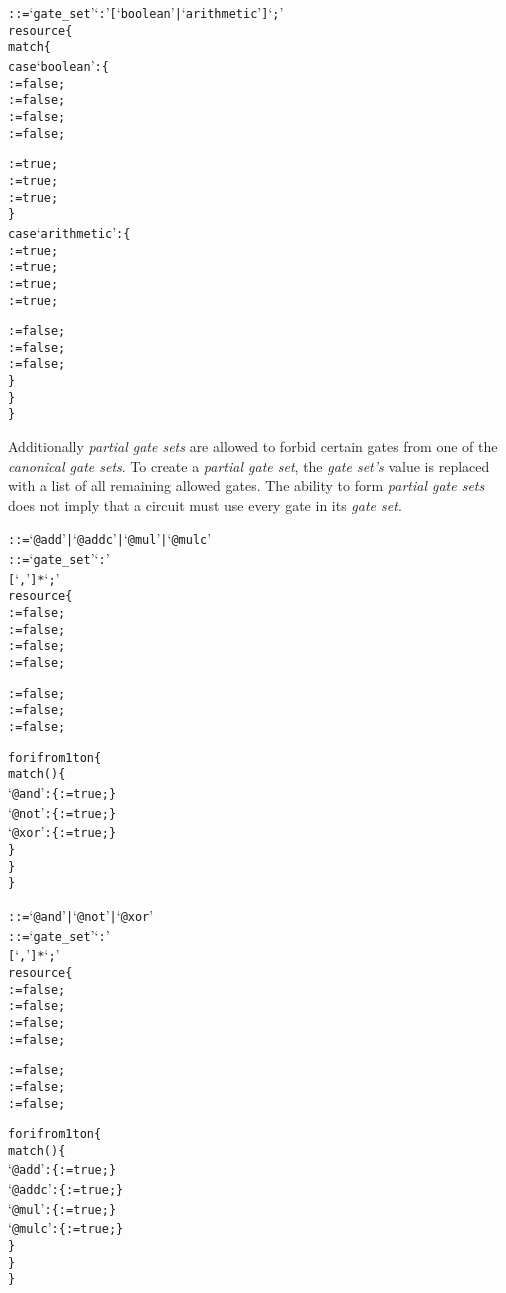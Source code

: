 \begin{alltt}\ttSyn
   ::= `gate_set' `:' [ `boolean' | `arithmetic' ] `;'\ttSem
  resource \{
    match \{
      case `boolean' : \{
         := false;
         := false;
         := false;
         := false;

         := true;
         := true;
         := true;
      \}
      case `arithmetic' : \{
         := true;
         := true;
         := true;
         := true;

         := false;
         := false;
         := false;
      \}
    \}
  \}
\end{alltt}

Additionally \textit{partial gate sets} are allowed to forbid certain gates from one of the \textit{canonical gate sets}.
To create a \textit{partial gate set}, the \textit{gate set's} value is replaced with a list of all remaining allowed gates.
The ability to form \textit{partial gate sets} does not imply that a circuit must use every gate in its \textit{gate set}.\\

\begin{alltt}\ttSyn
   ::= `@add' | `@addc' | `@mul' | `@mulc'
   ::= `gate_set' `:'
                [ `,'  ]* `;'\ttSem
  resource \{
     := false;
     := false;
     := false;
     := false;

     := false;
     := false;
     := false;

    for i from 1 to n \{
      match() \{
        `@and' : \{  := true; \}
        `@not' : \{  := true; \}
        `@xor' : \{  := true; \}
      \}
    \}
  \}\ttSyn

   ::= `@and' | `@not' | `@xor'
   ::= `gate_set' `:'
                [ `,'  ]* `;'\ttSem
  resource \{
     := false;
     := false;
     := false;
     := false;

     := false;
     := false;
     := false;

    for i from 1 to n \{
      match() \{
        `@add'  : \{  := true; \}
        `@addc' : \{  := true; \}
        `@mul'  : \{  := true; \}
        `@mulc' : \{  := true; \}
      \}
    \}
  \}\ttSyn
\end{alltt}

